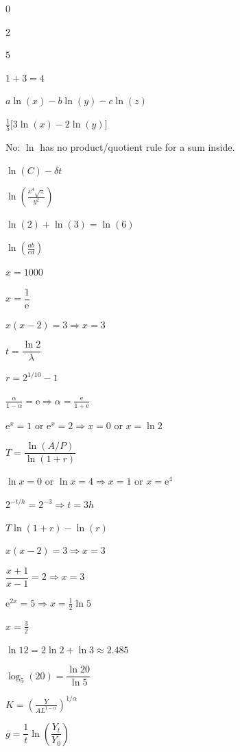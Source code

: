 \begin{solutions}
  \item $0$
  \item $2$
  \item $5$
  \item $1+3=4$
  \item $a\ln(x)-b\ln(y)-c\ln(z)$
  \item $\tfrac15\bigl[3\ln(x)-2\ln(y)\bigr]$
  \item No: $\ln$ has no product/quotient rule for a sum inside.
  \item $\ln(C)-\delta t$
  \item $\displaystyle\ln\left(\frac{x^{4}\sqrt{z}}{y^{2}}\right)$
  \item $\ln(2)+\ln(3)=\ln(6)$
  \item $\displaystyle\ln\left(\frac{ab}{cd}\right)$
  \item $x=1000$
  \item $x=\dfrac{1}{\mathrm{e}}$
  \item $x(x-2)=3\Rightarrow x=3$
  \item $t=\dfrac{\ln 2}{\lambda}$
  \item $r=2^{1/10}-1$
  \item $\displaystyle\frac{\alpha}{1-\alpha}=\mathrm{e}\Rightarrow
        \alpha=\frac{\mathrm{e}}{1+\mathrm{e}}$
  \item $\mathrm{e}^{x}=1$ or $\mathrm{e}^{x}=2\Rightarrow x=0$ or
        $x=\ln 2$
  \item $T=\dfrac{\ln(A/P)}{\ln(1+r)}$
  \item $\ln x=0$ or $\ln x=4\Rightarrow x=1$ or $x=\mathrm{e}^{4}$
  \item $2^{-t/h}=2^{-3}\Rightarrow t=3h$
  \item $T\ln(1+r)-\ln(r)$
  \item $x(x-2)=3\Rightarrow x=3$
  \item $\dfrac{x+1}{x-1}=2\Rightarrow x=3$
  \item $\mathrm{e}^{2x}=5\Rightarrow x=\tfrac12\ln 5$
  \item $x=\tfrac32$
  \item $\ln 12=2\ln 2+\ln 3\approx 2.485$
  \item $\log_{5}(20)=\dfrac{\ln 20}{\ln 5}$
  \item $K=\displaystyle\left(\frac{Y}{AL^{1-\alpha}}\right)^{1/\alpha}$
  \item $g=\dfrac{1}{t}\ln\!\left(\dfrac{Y_{t}}{Y_{0}}\right)$
\end{solutions}
